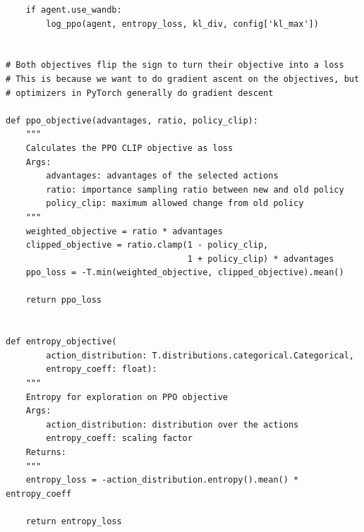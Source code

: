 \documentclass{article}
\begin{document}
\begin{lstlisting}
    if agent.use_wandb:
        log_ppo(agent, entropy_loss, kl_div, config['kl_max'])


# Both objectives flip the sign to turn their objective into a loss
# This is because we want to do gradient ascent on the objectives, but
# optimizers in PyTorch generally do gradient descent

def ppo_objective(advantages, ratio, policy_clip):
    """
    Calculates the PPO CLIP objective as loss
    Args:
        advantages: advantages of the selected actions
        ratio: importance sampling ratio between new and old policy
        policy_clip: maximum allowed change from old policy
    """
    weighted_objective = ratio * advantages
    clipped_objective = ratio.clamp(1 - policy_clip,
                                    1 + policy_clip) * advantages
    ppo_loss = -T.min(weighted_objective, clipped_objective).mean()

    return ppo_loss


def entropy_objective(
        action_distribution: T.distributions.categorical.Categorical,
        entropy_coeff: float):
    """
    Entropy for exploration on PPO objective
    Args:
        action_distribution: distribution over the actions
        entropy_coeff: scaling factor
    Returns:
    """
    entropy_loss = -action_distribution.entropy().mean() * entropy_coeff

    return entropy_loss
\end{lstlisting}
\newpage
\end{document}
